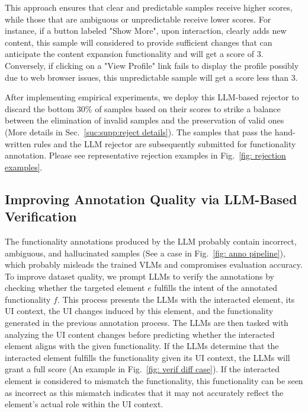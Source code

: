 This approach ensures that clear and predictable samples receive higher scores, while those that are ambiguous or unpredictable receive lower scores. For instance, if a button labeled "Show More", upon interaction, clearly adds new content, this sample will considered to provide sufficient changes that can anticipate the content expansion functionality and will get a score of 3. Conversely, if clicking on a "View Profile" link fails to display the profile possibly due to web browser issues, this unpredictable sample will get a score less than 3.

After implementing empirical experiments, we deploy this LLM-based rejector to discard the bottom 30\% of samples based on their scores to strike a balance between the elimination of invalid samples and the preservation of valid ones (More details in Sec.~\ref{suc:supp:reject details}). The samples that pass the hand-written rules and the LLM rejector are subsequently submitted for functionality annotation. Please see representative rejection examples in Fig.~\ref{fig: rejection examples}.

\subsection{Improving Annotation Quality via LLM-Based Verification}
The functionality annotations produced by the LLM probably contain incorrect, ambiguous, and hallucinated samples (See a case in Fig.~\ref{fig: anno pipeline}), which probably misleads the trained VLMs and compromises evaluation accuracy. To improve dataset quality, we prompt LLMs to verify the annotations by checking whether the targeted element $e$ fulfills the intent of the annotated functionality $f$. This process presents the LLMs with the interacted element, its UI context, the UI changes induced by this element, and the functionality generated in the previous annotation process. The LLMs are then tasked with analyzing the UI content changes before predicting whether the interacted element aligns with the given functionality. If the LLMs determine that the interacted element fulfills the functionality given its UI context, the LLMs will grant a full score (An example in Fig.~\ref{fig: verif diff case}). If the interacted element is considered to mismatch the functionality, this functionality can be seen as incorrect as this mismatch indicates that it may not accurately reflect the element's actual role within the UI context.

